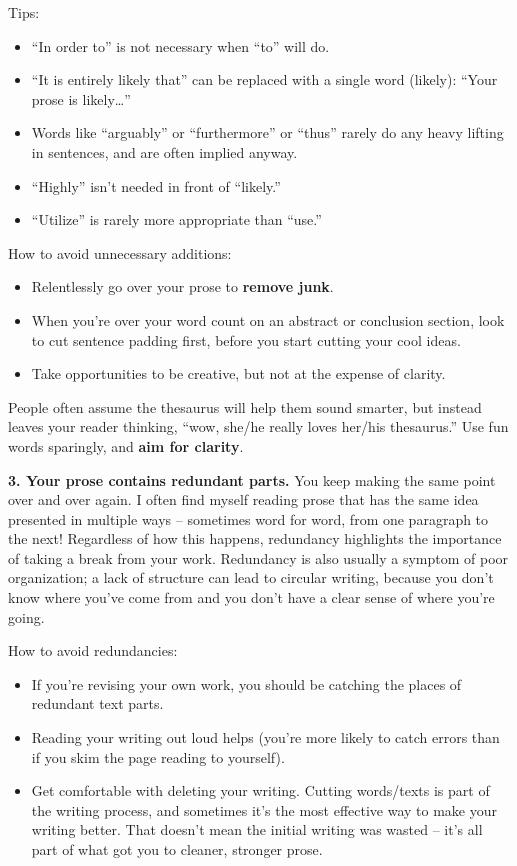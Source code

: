 \documentclass[
]{book}
\providecommand{\tightlist}{%
  \setlength{\itemsep}{0pt}\setlength{\parskip}{0pt}}
\begin{document}
Tips:

\begin{itemize}
\tightlist
\item
  ``In order to'' is not necessary when ``to'' will do.
\item
  ``It is entirely likely that'' can be replaced with a single word (likely): ``Your prose is likely\ldots{}''
\item
  Words like ``arguably'' or ``furthermore'' or ``thus'' rarely do any heavy lifting in sentences, and are often implied anyway.
\item
  ``Highly'' isn't needed in front of ``likely.''
\item
  ``Utilize'' is rarely more appropriate than ``use.''
\end{itemize}

How to avoid unnecessary additions:

\begin{itemize}
\tightlist
\item
  Relentlessly go over your prose to \textbf{remove junk}.
\item
  When you're over your word count on an abstract or conclusion section, look to cut sentence padding first, before you start cutting your cool ideas.
\item
  Take opportunities to be creative, but not at the expense of clarity.
\end{itemize}

People often assume the thesaurus will help them sound smarter, but instead leaves your reader thinking, ``wow, she/he really loves her/his thesaurus.'' Use fun words sparingly, and \textbf{aim for clarity}.

\hfill\break

\textbf{3. Your prose contains redundant parts.}
You keep making the same point over and over again. I often find myself reading prose that has the same idea presented in multiple ways -- sometimes word for word, from one paragraph to the next! Regardless of how this happens, redundancy highlights the importance of taking a break from your work. Redundancy is also usually a symptom of poor organization; a lack of structure can lead to circular writing, because you don't know where you've come from and you don't have a clear sense of where you're going.

How to avoid redundancies:

\begin{itemize}
\tightlist
\item
  If you're revising your own work, you should be catching the places of redundant text parts.
\item
  Reading your writing out loud helps (you're more likely to catch errors than if you skim the page reading to yourself).
\item
  Get comfortable with deleting your writing. Cutting words/texts is part of the writing process, and sometimes it's the most effective way to make your writing better. That doesn't mean the initial writing was wasted -- it's all part of what got you to cleaner, stronger prose.
\end{itemize}
\end{document}
